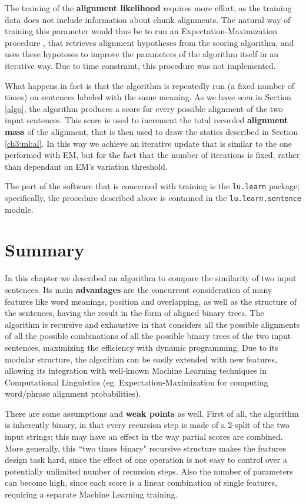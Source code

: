 The training of the \textbf{alignment likelihood} requires more effort, as the training data does not include information about chunk alignments. The natural way of training this parameter would thus be to run an Expectation-Maximization procedure \citep{Dempster77maximumlikelihood}, that retrieves alignment hypotheses from the scoring algorithm, and uses these hypoteses to improve the parameters of the algorithm itself in an iterative way. Due to time constraint, this procedure was not implemented.

What happens in fact is that the algorithm is repeatedly run (a fixed number of times) on sentences labeled with the same meaning. As we have seen in Section \ref{algo}, the algorithm produces a score for every possible alignment of the two input sentences. This score is used to increment the total recorded \textbf{alignment mass} of the alignment, that is then used to draw the statics described in Section \ref{ch3:ml:al}. In this way we achieve an iterative update that is similar to the one performed with EM, but for the fact that the number of iterations is fixed, rather than dependant on EM's variation threshold.

The part of the software that is concerned with training is the \texttt{lu.learn} package; specifically, the procedure described above is contained in the \texttt{lu.learn.sentence} module.

\section{Summary} \label{conclusions}
In this chapter we described an algorithm to compare the similarity of two input sentences. Its main \textbf{advantages} are the concurrent consideration of many features like word meanings, position and overlapping, as well as the structure of the sentences, having the result in the form of aligned binary trees. The algorithm is recursive and exhaustive in that considers all the possible alignments of all the possible combinations of all the possible binary trees of the two input sentences, maximizing the efficiency with dynamic programming. Due to its modular structure, the algorithm can be easily extended with new features, allowing its integration with well-known Machine Learning techniques in Computational Linguistics (eg. Expectation-Maximization for computing word/phrase alignment probabilities).

There are some assumptions and \textbf{weak points} as well. First of all, the algorithm is inherently binary, in that every recursion step is made of a 2-split of the two input strings; this may have an effect in the way partial scores are combined. More generally, this ``two times binary" recursive structure makes the features design task hard, since the effect of one operation is not easy to control over a potentially unlimited number of recursion steps. Also the number of parameters can become high, since each score is a linear combination of single features, requiring a separate Machine Learning training.

